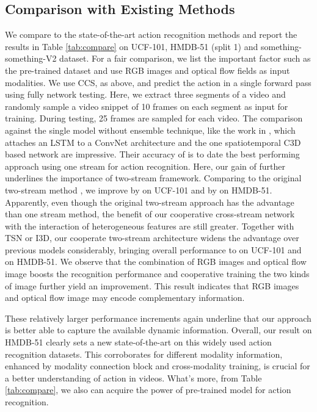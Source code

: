 \documentclass[conference,compsoc]{IEEEtran}
\begin{document}
\subsection{Comparison with Existing Methods}
We compare to the state-of-the-art action recognition methods and report the results in Table \ref{tab:compare} on UCF-101, HMDB-51 (split 1) and something-something-V2 dataset. For a fair comparison, we list the important factor such as the pre-trained dataset and use RGB images and optical flow fields as input modalities. We use CCS, as above, and predict the action in a single forward pass using fully network testing. Here, we extract three segments of a video and randomly sample a video snippet of 10 frames on each segment as input for training. During testing, 25 frames are sampled for each video. The comparison against the single model without ensemble technique, like the work in \cite{donahue2015long}, which attaches an LSTM to a ConvNet architecture and the one spatiotemporal C3D based network \cite{tran2017convnet} are impressive. Their accuracy of  is to date the best performing approach using one stream for action recognition. Here, our gain of  further underlines the importance of two-stream framework. Comparing to the original two-stream method \cite{simonyan2014two}, we improve by  on UCF-101 and by on HMDB-51. Apparently, even though the original two-stream approach has the advantage than one stream method, the benefit of our cooperative cross-stream network with the interaction of heterogeneous features are still greater. Together with TSN or I3D, our cooperate two-stream architecture widens the advantage over previous models considerably, bringing overall performance to  on UCF-101 and  on HMDB-51. We observe that the combination of RGB images and optical flow image boosts the recognition performance and cooperative training the two kinds of image further yield an improvement. This result indicates that RGB images and optical flow image may encode complementary information.

These relatively larger performance increments again underline that our approach is better able to capture the available dynamic information. Overall, our result  on HMDB-51 clearly sets a new state-of-the-art on this widely used action recognition datasets. This corroborates for different modality information, enhanced by modality connection block and cross-modality training, is crucial for a better understanding of action in videos. What's more, from Table \ref{tab:compare}, we also can acquire the power of pre-trained model for action recognition.
\end{document}
